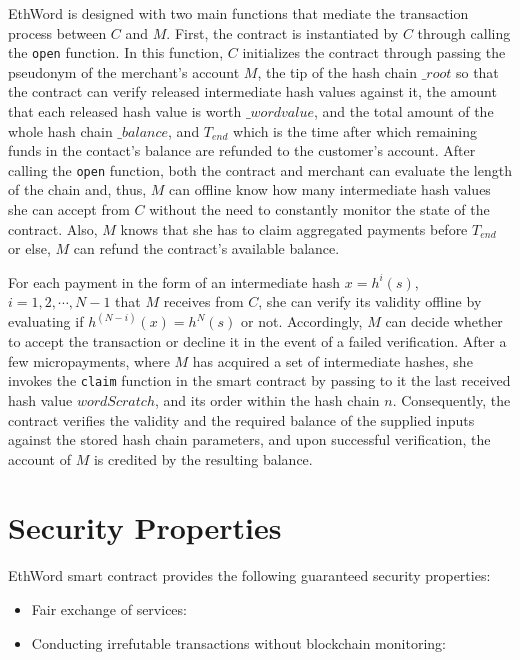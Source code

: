 \documentclass{llncs}
\def\code#1{\texttt{#1}}
\begin{document}
\noindent EthWord is designed with two main functions that mediate the transaction process between $C$ and $M$. First, the contract is instantiated by $C$ through calling the \code{open} function. In this function, $C$ initializes the contract through passing the pseudonym of the merchant's account $M$, the tip of the hash chain $\_root$ so that the contract can verify released intermediate hash values against it, the amount that each released hash value is worth $\_wordvalue$, and the total amount of the whole hash chain $\_balance$, and $T_{end}$ which is the time after which remaining funds in the contact's balance are refunded to the customer's account. After calling the \code{open} function, both the contract and merchant can evaluate the length of the chain and, thus, $M$ can offline know how many intermediate hash values she can accept from $C$ without the need to constantly monitor the state of the contract. Also, $M$ knows that she has to claim aggregated payments before $T_{end}$ or else, $M$ can refund the contract's available balance.
\\
\par{} For each payment in the form of an intermediate hash $x=h^i(s)$, $i=1,2,\cdots,N-1$ that $M$ receives from $C$, she can verify its validity offline by evaluating if $h^{(N-i)}(x) = h^N(s)$ or not. Accordingly, $M$ can decide whether to accept the transaction or decline it in the event of a failed verification. After a few micropayments, where $M$ has acquired a set of intermediate hashes, she invokes the \code{claim} function in the smart contract by passing to it the last received hash value $wordScratch$, and its order within the hash chain $n$. Consequently, the contract verifies the validity and the required balance of the supplied inputs against the stored hash chain parameters, and upon successful verification, the account of $M$ is credited by the resulting balance.
\section{Security Properties}
EthWord smart contract provides the following guaranteed security properties:
\begin{itemize}
	\item Fair exchange of services:
	\item Conducting irrefutable transactions without blockchain monitoring:
\end{itemize}
%
%
\end{document}

